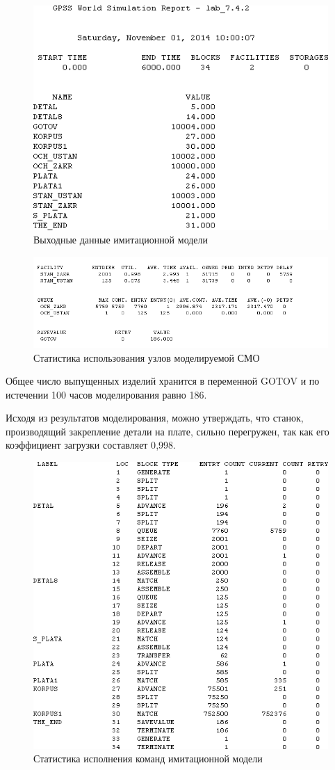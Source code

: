 \begin{figure}[h!]
  \centering
  \includegraphics[width=0.8\linewidth]{pic/report_1}
  \caption{Выходные данные имитационной модели}
  \label{pic:report_1}
\end{figure}

\begin{figure}[h!]
  \centering
  \includegraphics[width=1\linewidth]{pic/report_3}
  \caption{Статистика использования узлов моделируемой СМО}
  \label{pic:report_stat}
\end{figure}

Общее число выпущенных изделий хранится в переменной GOTOV и 
по истечении 100 часов моделирования равно 186.

Исходя из результатов моделирования, можно утверждать, что 
станок, производящий закрепление детали на плате, сильно перегружен,
так как его коэффициент загрузки составляет 0{,}998.

\begin{figure}[h!]
  \centering
  \includegraphics[width=0.8\linewidth]{pic/report_2}
  \caption{Статистика исполнения команд имитационной модели}
  \label{pic:report_2}
\end{figure}


\newpage
